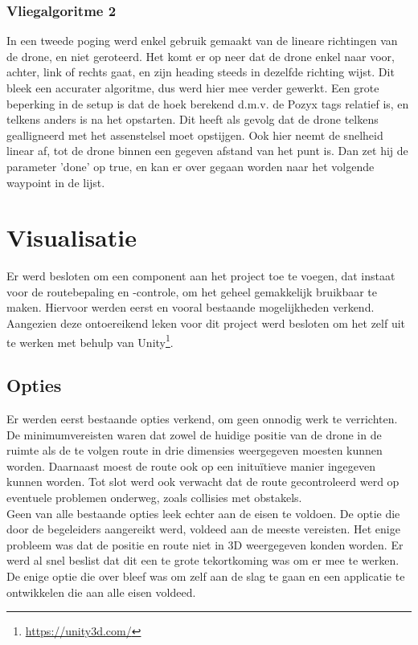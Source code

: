 \subsubsection{Vliegalgoritme 2}
In een tweede poging werd enkel gebruik gemaakt van de lineare richtingen van de drone, en niet geroteerd.
Het komt er op neer dat de drone enkel naar voor, achter, link of rechts gaat, en zijn heading steeds in dezelfde richting wijst.
Dit bleek een accurater algoritme, dus werd hier mee verder gewerkt.
Een grote beperking in de setup is dat de hoek berekend d.m.v. de Pozyx tags relatief is, en telkens anders is na het opstarten.
Dit heeft als gevolg dat de drone telkens gealligneerd met het assenstelsel moet opstijgen.
Ook hier neemt de snelheid linear af, tot de drone binnen een gegeven afstand van het punt is.
Dan zet hij de parameter 'done' op true, en kan er over gegaan worden naar het volgende waypoint in de lijst.

\section{Visualisatie} \label{sec:visualization}
Er werd besloten om een component aan het project toe te voegen, dat instaat voor de routebepaling en -controle, om het geheel gemakkelijk bruikbaar te maken.
Hiervoor werden eerst en vooral bestaande mogelijkheden verkend.
Aangezien deze ontoereikend leken voor dit project werd besloten om het zelf uit te werken met behulp van Unity\footnote{\url{https://unity3d.com/}}.

\subsection{Opties} \label{sec:opties}
Er werden eerst bestaande opties verkend, om geen onnodig werk te verrichten.
De minimumvereisten waren dat zowel de huidige positie van de drone in de ruimte als de te volgen route in drie dimensies weergegeven moesten kunnen worden.
Daarnaast moest de route ook op een inituïtieve manier ingegeven kunnen worden.
Tot slot werd ook verwacht dat de route gecontroleerd werd op eventuele problemen onderweg, zoals collisies met obstakels.\\

Geen van alle bestaande opties leek echter aan de eisen te voldoen.
De optie die door de begeleiders aangereikt werd, voldeed aan de meeste vereisten.
Het enige probleem was dat de positie en route niet in 3D weergegeven konden worden.
Er werd al snel beslist dat dit een te grote tekortkoming was om er mee te werken.
De enige optie die over bleef was om zelf aan de slag te gaan en een applicatie te ontwikkelen die aan alle eisen voldeed.

